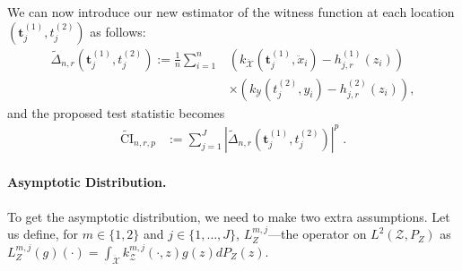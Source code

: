 We can now introduce our new estimator of the witness function at each location $(\mathbf{t}^{(1)}_j,t^{(2)}_j)$ as follows:
\begin{align*}
  \widetilde{\Delta}_{n,r}(\mathbf{t}_j^{(1)},t_j^{(2)}):= \frac{1}{n}\sum_{i=1}^n & \left(k_{\mathcal{\ddot{X}}}(\mathbf{t}_j^{(1)},\ddot{x}_i)- h^{(1)}_{j,r}(z_i)\right)\\
  &\times\left(k_{\mathcal{Y}}(t^{(2)}_j,y_i)- h^{(2)}_{j,r}(z_i)\right),
\end{align*} 
and the proposed test statistic becomes
\begin{align*}
\widetilde{\text{CI}}_{n,r,p}&:=\sum_{j=1}^J \left|  \widetilde{\Delta}_{n,r}(\mathbf{t}^{(1)}_j,t^{(2)}_j)\right|^p\;.
\end{align*} 
\paragraph{Asymptotic Distribution.} To get the asymptotic distribution, we need to make two extra assumptions. Let us define, for $m\in\{1,2\}$ and $j\in\{1,\dots,J\}$, $L^{m,j}_{Z}$---the operator on $L^2(\mathcal{Z},P_{Z})$ as
   $L^{m,j}_{Z}(g)(\cdot) = \int_{\mathcal{\ddot{X}}} k^{m,j}_{\mathcal{Z}}(\cdot,z) g(z)dP_{Z}(z)$.

